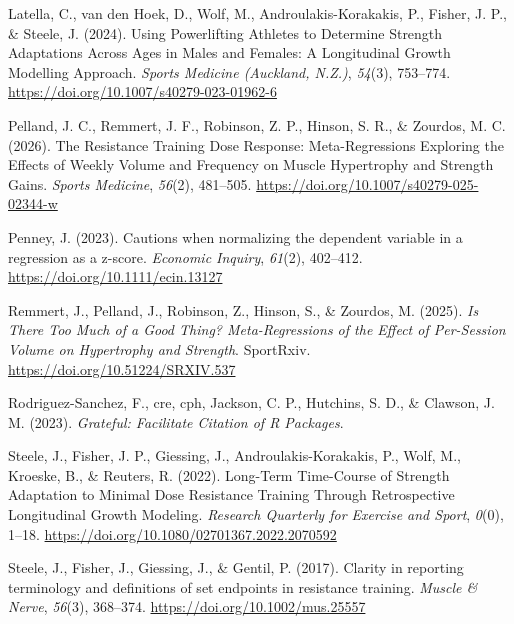 \documentclass[
]{article}
\newlength{\cslhangindent}
\newenvironment{CSLReferences}[2] %
 {\begin{list}{}{%
  \setlength{\itemindent}{0pt}
  \setlength{\leftmargin}{0pt}
  \setlength{\parsep}{0pt}
  \ifodd #1
   \setlength{\leftmargin}{\cslhangindent}
   \setlength{\itemindent}{-1\cslhangindent}
  \fi
  \setlength{\itemsep}{#2\baselineskip}}}
 {\end{list}}
\begin{document}
\begin{CSLReferences}{1}{0}
Latella, C., van den Hoek, D., Wolf, M., Androulakis-Korakakis, P.,
Fisher, J. P., \& Steele, J. (2024). Using {Powerlifting Athletes} to
{Determine Strength Adaptations Across Ages} in {Males} and {Females}:
{A Longitudinal Growth Modelling Approach}. \emph{Sports Medicine
(Auckland, N.Z.)}, \emph{54}(3), 753--774.
\url{https://doi.org/10.1007/s40279-023-01962-6}

Pelland, J. C., Remmert, J. F., Robinson, Z. P., Hinson, S. R., \&
Zourdos, M. C. (2026). The {Resistance Training Dose Response}:
{Meta-Regressions Exploring} the {Effects} of {Weekly Volume} and
{Frequency} on {Muscle Hypertrophy} and {Strength Gains}. \emph{Sports
Medicine}, \emph{56}(2), 481--505.
\url{https://doi.org/10.1007/s40279-025-02344-w}

Penney, J. (2023). Cautions when normalizing the dependent variable in a
regression as a z-score. \emph{Economic Inquiry}, \emph{61}(2),
402--412. \url{https://doi.org/10.1111/ecin.13127}

Remmert, J., Pelland, J., Robinson, Z., Hinson, S., \& Zourdos, M.
(2025). \emph{Is {There Too Much} of a {Good Thing}? {Meta-Regressions}
of the {Effect} of {Per-Session Volume} on {Hypertrophy} and
{Strength}}. SportRxiv. \url{https://doi.org/10.51224/SRXIV.537}

Rodriguez-Sanchez, F., cre, cph, Jackson, C. P., Hutchins, S. D., \&
Clawson, J. M. (2023). \emph{Grateful: {Facilitate Citation} of {R
Packages}}.

Steele, J., Fisher, J. P., Giessing, J., Androulakis-Korakakis, P.,
Wolf, M., Kroeske, B., \& Reuters, R. (2022). Long-{Term Time-Course} of
{Strength Adaptation} to {Minimal Dose Resistance Training Through
Retrospective Longitudinal Growth Modeling}. \emph{Research Quarterly
for Exercise and Sport}, \emph{0}(0), 1--18.
\url{https://doi.org/10.1080/02701367.2022.2070592}

Steele, J., Fisher, J., Giessing, J., \& Gentil, P. (2017). Clarity in
reporting terminology and definitions of set endpoints in resistance
training. \emph{Muscle \& Nerve}, \emph{56}(3), 368--374.
\url{https://doi.org/10.1002/mus.25557}


\end{CSLReferences}
\end{document}
